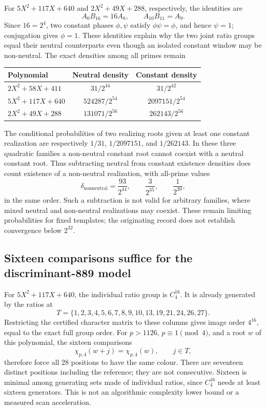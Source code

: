 \documentclass[11pt]{article}
\theoremstyle{definition}\newtheorem{definition}[theorem]{Definition}
\begin{document}
For $5X^2+117X+640$ and $2X^2+49X+288$, respectively, the
identities are
\[
 A_0B_{16}=16A_8,\qquad A_{10}B_{11}=A_9.
\]
Since $16=2^4$, two constant phases $\phi,\psi$ satisfy
$\phi\psi=\phi$, and hence $\psi=1$; conjugation gives
$\phi=1$. These identities explain why the two joint ratio
groups equal their neutral counterparts even though an isolated
constant window may be non-neutral.
The exact densities among all primes remain
\begin{center}
\begin{tabular}{lcc}
\toprule
Polynomial & Neutral density & Constant density\\
\midrule
$2X^2+58X+411$ & $31/2^{44}$ & $31/2^{42}$\\
$5X^2+117X+640$ & $524287/2^{54}$ & $2097151/2^{54}$\\
$2X^2+49X+288$ & $131071/2^{56}$ & $262143/2^{56}$\\
\bottomrule
\end{tabular}
\end{center}
The conditional probabilities of two realizing roots given at
least one constant realization are respectively
$1/31$, $1/2097151$, and $1/262143$.
In these three quadratic families a non-neutral constant root
cannot coexist with a neutral constant root. Thus subtracting
neutral from constant existence densities does count existence
of a non-neutral realization, with all-prime values
\[
 \delta_{\mathrm{nonneutral}}=
 \frac{93}{2^{44}},\qquad\frac3{2^{35}},\qquad\frac1{2^{39}},
\]
in the same order. Such a subtraction is not valid for arbitrary
families, where mixed neutral and non-neutral realizations may
coexist. These remain limiting probabilities for fixed templates;
the originating record does not establish convergence below $2^{32}$.

\subsection{Sixteen comparisons suffice for the discriminant-889 model}
For $5X^2+117X+640$, the individual ratio group is $C_4^{16}$.
It is already generated by the ratios at
\[
 T=\{1,2,3,4,5,6,7,8,9,10,13,19,21,24,26,27\}.
\]
Restricting the certified character matrix to these columns gives
image order $4^{16}$, equal to the exact full group order.
For $p>1126$, $p\equiv1\pmod4$, and a root $w$ of this
polynomial, the sixteen comparisons
\[
 \chi_{p,4}(w+j)=\chi_{p,4}(w),\qquad j\in T,
\]
therefore force all 28 positions to have the same colour.
There are seventeen distinct positions including the reference;
they are not consecutive. Sixteen is minimal among generating
sets made of individual ratios, since $C_4^{16}$ needs at least
sixteen generators. This is not an algorithmic complexity lower
bound or a measured scan acceleration.
\end{document}
